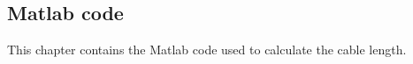 \documentclass[11pt,titlepage]{report}
\begin{document}
\begin{appendices}
\renewcommand{\chapternumber}{\appendixname\space\thechapter}

\chapter{Matlab code}
\label{app:matlab}
This chapter contains the Matlab code used to calculate the cable length.


\end{appendices}
\end{document}
